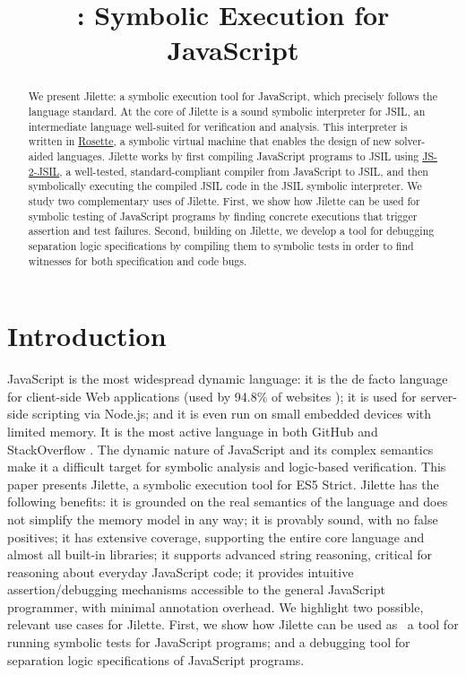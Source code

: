 \documentclass{llncs}
\title{\jilette: Symbolic Execution for JavaScript}
\author{}
\institute{}
\newcommand{\jsil}{JSIL\xspace}
\newcommand{\JSComp}{JS-2-JSIL\xspace}
\newcommand{\polish}[1]{{\color{red}#1}}
\newcommand{\jilette}{Jilette\xspace}
\begin{document}
%

\maketitle 

\begin{abstract}
We present \jilette: a symbolic execution tool for JavaScript, which precisely follows the language standard. At the core of \jilette is a sound symbolic interpreter for \jsil, an intermediate language well-suited for verification and analysis. This interpreter is written in \underline{Rosette}, a symbolic virtual machine that enables the design of new solver-aided languages. 
\jilette works by first compiling JavaScript programs to \jsil using \underline{\JSComp}, a well-tested, standard-compliant compiler from JavaScript to \jsil, and then symbolically executing the compiled \jsil code in the \jsil symbolic interpreter. 
We study two complementary uses of \jilette. 
First, we show how \jilette can be used for symbolic testing of JavaScript programs by finding concrete executions that trigger assertion and test failures. 
Second, building on \jilette, we develop a tool for debugging separation logic specifications
by compiling them to symbolic tests in order to find witnesses for both specification
and code bugs.
\end{abstract}

\section{Introduction}

JavaScript is the most widespread dynamic language: it is the de facto language for client-side Web applications (used by 94.8\% of websites \cite{JS948percent});
it is used for server-side scripting via Node.js; and it is even run on small embedded devices with limited 
memory. It is the most active language in both GitHub \cite{GithubActive} and StackOverflow \cite{SOActive}.
The dynamic nature of JavaScript and its complex semantics make it a difficult target for
symbolic analysis and logic-based verification. 
This paper presents \jilette, a symbolic execution tool for ES5 Strict. Jilette has the following benefits: 
 it is grounded on the real semantics of the language and does not simplify the memory model in any way; 
 it is provably sound, with no false positives;
 it has extensive coverage, supporting the entire core language and almost all built-in libraries; 
 it supports advanced string reasoning, critical for reasoning about \polish{everyday} JavaScript code; 
 it provides \polish{intuitive assertion/debugging mechanisms} accessible to the general JavaScript programmer, with minimal annotation overhead. 
%
We highlight two possible, relevant use cases for \jilette. First, we show how \jilette can be used as ~a tool for running symbolic tests for JavaScript programs; and  a debugging tool for separation logic specifications of JavaScript programs. 
\end{document}
